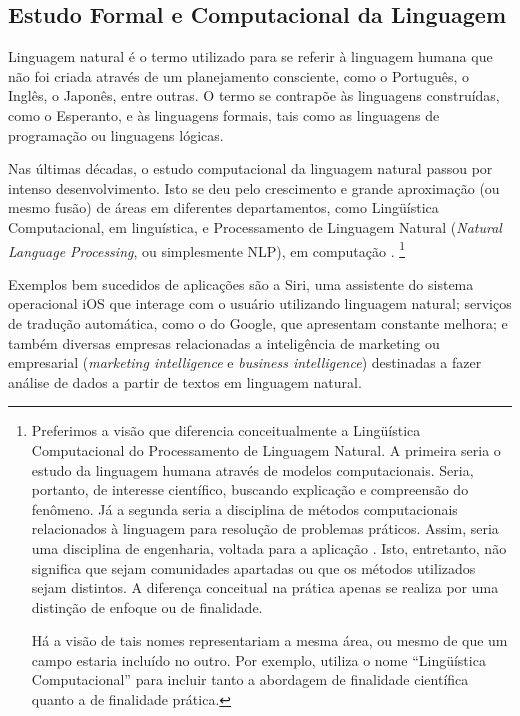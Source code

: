 \subsection{Estudo Formal e Computacional da Linguagem}

	Linguagem natural é o termo utilizado para se referir à linguagem humana que não foi criada através de um planejamento consciente, como o Português, o Inglês, o Japonês, entre outras. \fixd O termo se contrapõe às linguagens construídas, como o Esperanto, e às linguagens formais, tais como as linguagens de programação ou linguagens lógicas.
	
	Nas últimas décadas, o estudo computacional da linguagem natural passou por intenso desenvolvimento. Isto se deu pelo crescimento e grande aproximação (ou mesmo fusão) de áreas em diferentes departamentos, como Lingüística Computacional, em linguística, e Processamento de Linguagem Natural (\textit{Natural Language Processing}, ou simplesmente NLP), em computação \citep[pp.~xxi, 10]{Jurafsky:2009}.
		\footnote{Preferimos a visão que diferencia conceitualmente a Lingüística Computacional do Processamento de Linguagem Natural. A primeira seria o estudo da linguagem humana através de modelos computacionais. Seria, portanto, de interesse científico, buscando explicação e compreensão do fenômeno. Já a segunda seria a disciplina de métodos computacionais relacionados à linguagem para resolução de problemas práticos. Assim, seria uma disciplina de engenharia, voltada para a aplicação \citep{CarnegieMellon}. Isto, entretanto, não significa que sejam comunidades apartadas ou que os métodos utilizados sejam distintos. A diferença conceitual na prática apenas se realiza por uma distinção de enfoque ou de finalidade.
		
		Há a visão de tais nomes representariam a mesma área, ou mesmo de que um campo estaria incluído no outro. Por exemplo, \citet[pp.~1--9]{Grishman:1986} utiliza o nome ``Lingüística Computacional'' para incluir tanto a abordagem de finalidade científica quanto a de finalidade prática.}
	
	Exemplos bem sucedidos de aplicações são a Siri, uma assistente do sistema operacional iOS que interage com o usuário utilizando linguagem natural; serviços de tradução automática, como o do Google, que apresentam constante melhora; e também diversas empresas relacionadas a inteligência de marketing ou empresarial (\textit{marketing intelligence} e \textit{business intelligence}) destinadas a fazer análise de dados a partir de textos em linguagem natural.

